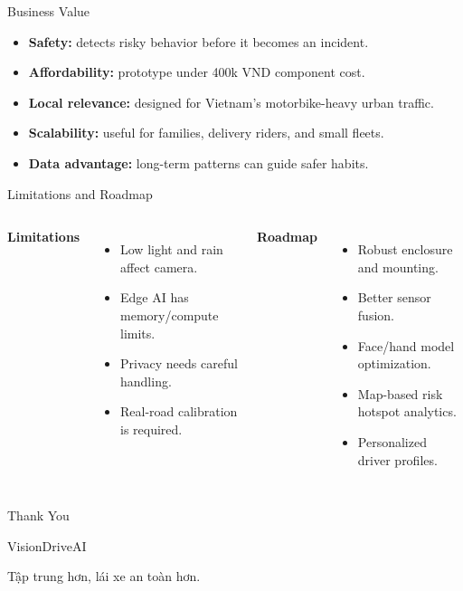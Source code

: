 \documentclass[aspectratio=169]{beamer}
\begin{document}
\begin{frame}{Business Value}
  \begin{itemize}
    \item \textbf{Safety:} detects risky behavior before it becomes an incident.
    \item \textbf{Affordability:} prototype under 400k VND component cost.
    \item \textbf{Local relevance:} designed for Vietnam's motorbike-heavy urban traffic.
    \item \textbf{Scalability:} useful for families, delivery riders, and small fleets.
    \item \textbf{Data advantage:} long-term patterns can guide safer habits.
  \end{itemize}
\end{frame}

\begin{frame}{Limitations and Roadmap}
  \begin{columns}
    \textbf{Limitations}
    \begin{itemize}
      \item Low light and rain affect camera.
      \item Edge AI has memory/compute limits.
      \item Privacy needs careful handling.
      \item Real-road calibration is required.
    \end{itemize}
    \textbf{Roadmap}
    \begin{itemize}
      \item Robust enclosure and mounting.
      \item Better sensor fusion.
      \item Face/hand model optimization.
      \item Map-based risk hotspot analytics.
      \item Personalized driver profiles.
    \end{itemize}
  \end{columns}
\end{frame}

\begin{frame}
  \begin{center}
    \Huge Thank You
    \vspace{0.6cm}

    \Large VisionDriveAI
    \vspace{0.2cm}

    \normalsize Tập trung hơn, lái xe an toàn hơn.
  \end{center}
\end{frame}
\end{document}
